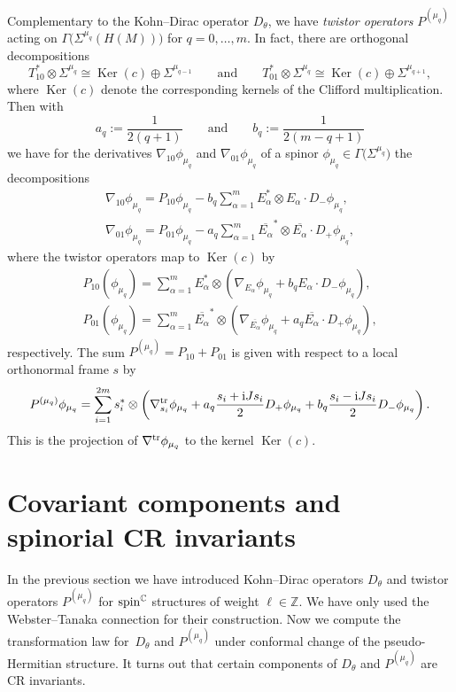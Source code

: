 \documentclass[pdftex]{sigma}
\numberwithin{equation}{section}
\newcommand{\ZZ}{\mathbb{Z}}
\newcommand{\CC}{\mathbb{C}}
\begin{document}
Complementary to the Kohn--Dirac operator $D_\theta$, we have {\em twistor operators} $P^{(\mu_q)}$ acting on $\Gamma\big(\Sigma^{\mu_q}(H(M))\big)$ for $q=0,\dots,m$.
In fact, there are orthogonal decompositions
\[
T_{10}^*\otimes \Sigma^{\mu_q} \cong \operatorname{Ker}(c)\oplus \Sigma^{\mu_{q-1}}\qquad\mbox{and}\qquad T_{01}^*\otimes \Sigma^{\mu_q} \cong \operatorname{Ker}(c)\oplus \Sigma^{\mu_{q+1}},
\]
where $\operatorname{Ker}(c)$ denote the corresponding kernels of the Clifford multiplication. Then
with
\[
a_q:= \frac{1}{2(q+1)}\qquad\mbox{and}\qquad b_q:=\frac{1}{2(m-q+1)}
\]
we have for the derivatives $\nabla_{10}\phi_{\mu_q}$ and $\nabla_{01}\phi_{\mu_q}$ of a spinor $\phi_{\mu_q}\in\Gamma\big(\Sigma^{\mu_q}\big)$ the decompositions
\begin{gather*}
\nabla_{10}\phi_{\mu_q} = P_{10}\phi_{\mu_q} - b_q\sum_{\alpha=1}^m E_\alpha^*\otimes E_\alpha\cdot D_-\phi_{\mu_q},\\
\nabla_{01}\phi_{\mu_q} = P_{01}\phi_{\mu_q} - a_q\sum_{\alpha=1}^m \overline{E_\alpha}^*\otimes \overline{E_\alpha}\cdot D_+\phi_{\mu_q},
\end{gather*}
where the twistor operators map to $\operatorname{Ker}(c)$ by
\begin{gather*}
P_{10}(\phi_{\mu_q}) = \sum_{\alpha=1}^m E_\alpha^*\otimes \left( \nabla_{E_\alpha}\phi_{\mu_q} + b_q E_\alpha\cdot D_-\phi_{\mu_q}\right),\\
P_{01}(\phi_{\mu_q}) = \sum_{\alpha=1}^m \overline{E_\alpha}^*\otimes \left( \nabla_{\overline{E_\alpha}}\phi_{\mu_q} +
a_q \overline{E_\alpha}\cdot D_+\phi_{\mu_q}\right),
\end{gather*}
respectively. The sum $P^{(\mu_q)}=P_{10}+P_{01}$ is given with respect to a local orthonormal
frame $s$ by
\[
P^{(\mu_q)}\phi_{\mu_q} = \sum_{i=1}^{2m} s_i^*\otimes\left( \nabla^{\rm tr}_{s_i}\phi_{\mu_q}+a_q\frac{s_i+{\rm i}Js_i}{2}D_+\phi_{\mu_q} +b_q\frac{s_i-{\rm i}Js_i}{2}D_-\phi_{\mu_q} \right).
\]
This is the projection of $\nabla^{\rm tr}\phi_{\mu_q}$ to the kernel $\operatorname{Ker}(c)$.

\section{Covariant components and spinorial CR invariants} \label{Sec7}

In the previous section we have introduced Kohn--Dirac operators $D_\theta$ and twistor operators $P^{(\mu_q)}$ for
${\rm spin}^\CC$ structures of weight $\ell\in\ZZ$. We have only used the Webster--Tanaka connection for their construction.
Now we compute the transformation law for~$D_\theta$ and $P^{(\mu_q)}$ under conformal change of the pseudo-Hermitian structure.
It turns out that certain components of $D_\theta$ and $P^{(\mu_q)}$ are CR invariants.
\end{document}
